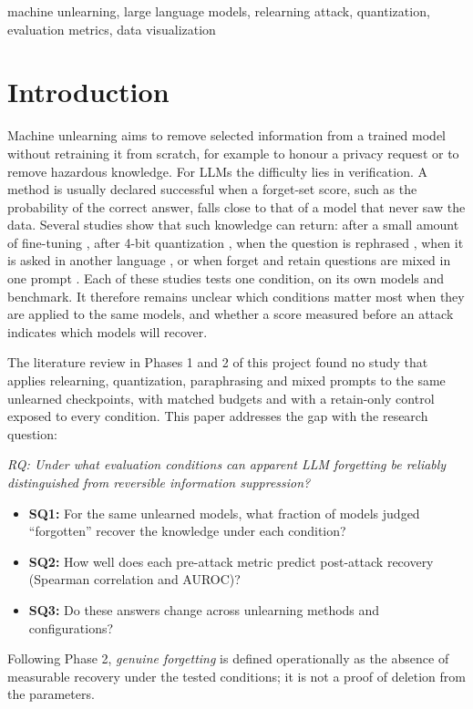 \documentclass[conference]{IEEEtran}
\begin{document}
\begin{IEEEkeywords}
machine unlearning, large language models, relearning attack, quantization, evaluation metrics, data visualization
\end{IEEEkeywords}

\section{Introduction}
Machine unlearning aims to remove selected information from a trained model without retraining it from scratch, for example to honour a privacy request or to remove hazardous knowledge. For LLMs the difficulty lies in verification. A method is usually declared successful when a forget-set score, such as the probability of the correct answer, falls close to that of a model that never saw the data. Several studies show that such knowledge can return: after a small amount of fine-tuning \cite{xu2026deletion,hu2025jogging}, after 4-bit quantization \cite{zhang2025quant}, when the question is rephrased \cite{wang2026erasing}, when it is asked in another language \cite{hwang2026multilingual}, or when forget and retain questions are mixed in one prompt \cite{jeung2025seps}. Each of these studies tests one condition, on its own models and benchmark. It therefore remains unclear which conditions matter most when they are applied to the same models, and whether a score measured before an attack indicates which models will recover.

The literature review in Phases 1 and 2 of this project found no study that applies relearning, quantization, paraphrasing and mixed prompts to the same unlearned checkpoints, with matched budgets and with a retain-only control exposed to every condition. This paper addresses the gap with the research question:

\textit{RQ: Under what evaluation conditions can apparent LLM forgetting be reliably distinguished from reversible information suppression?}

\begin{itemize}
\item \textbf{SQ1:} For the same unlearned models, what fraction of models judged ``forgotten'' recover the knowledge under each condition?
\item \textbf{SQ2:} How well does each pre-attack metric predict post-attack recovery (Spearman correlation and AUROC)?
\item \textbf{SQ3:} Do these answers change across unlearning methods and configurations?
\end{itemize}
Following Phase 2, \emph{genuine forgetting} is defined operationally as the absence of measurable recovery under the tested conditions; it is not a proof of deletion from the parameters.
\end{document}
